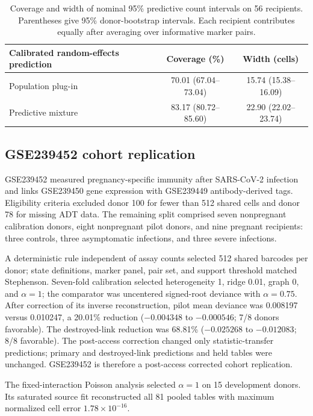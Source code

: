 \documentclass[10pt,a4paper]{article}
\begin{document}
\begin{table}[ht]
\centering\small
\caption{Coverage and width of nominal 95\% predictive count intervals on
56 recipients. Parentheses give 95\% donor-bootstrap intervals. Each
recipient contributes equally after averaging over informative marker pairs.}
\label{tab:s-predictive-coverage}
\begin{tabular}{@{}lcc@{}}
\toprule
Calibrated random-effects prediction & Coverage (\%) & Width (cells)\\
\midrule
Population plug-in & 70.01 (67.04--73.04) & 15.74 (15.38--16.09)\\
Predictive mixture & 83.17 (80.72--85.60) & 22.90 (22.02--23.74)\\
\bottomrule
\end{tabular}
\end{table}

\subsection{GSE239452 cohort replication}

GSE239452 measured pregnancy-specific immunity after SARS-CoV-2 infection~\cite{oh2024} and links GSE239450 gene expression with GSE239449 antibody-derived tags. Eligibility criteria excluded donor 100 for fewer than 512 shared cells and donor 78 for missing ADT data. The remaining split comprised seven nonpregnant calibration donors, eight nonpregnant pilot donors, and nine pregnant recipients: three controls, three asymptomatic infections, and three severe infections.

A deterministic rule independent of assay counts selected 512 shared barcodes per donor; state definitions, marker panel, pair set, and support threshold matched Stephenson. Seven-fold calibration selected heterogeneity 1, ridge 0.01, graph 0, and $\alpha=1$; the comparator was uncentered signed-root deviance with $\alpha=0.75$. After correction of its inverse reconstruction, pilot mean deviance was 0.008197 versus 0.010247, a 20.01\% reduction ($-0.004348$ to $-0.000546$; 7/8 donors favorable). The destroyed-link reduction was 68.81\% ($-0.025268$ to $-0.012083$; 8/8 favorable). The post-access correction changed only statistic-transfer predictions; primary and destroyed-link predictions and held tables were unchanged. GSE239452 is therefore a post-access corrected cohort replication.

The fixed-interaction Poisson analysis selected $\alpha=1$ on 15 development donors. Its saturated source fit reconstructed all 81 pooled tables with maximum normalized cell error $1.78\times10^{-16}$.
\end{document}
